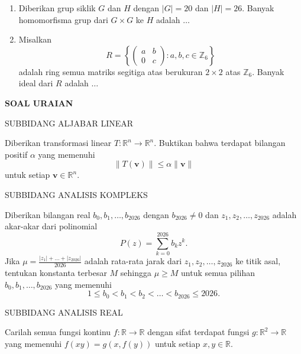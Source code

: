 \documentclass{article}
\begin{document}
\begin{enumerate}
  \item Diberikan grup siklik $G$ dan $H$ dengan $|G| = 20$ dan $|H| = 26$. Banyak homomorfisma grup dari $G \times G$ ke $H$ adalah $\dots$

  \item Misalkan
        \[
          R = \left\{ \begin{pmatrix} a & b \\ 0 & c \end{pmatrix} : a,b,c \in \mathbb{Z}_6 \right\}
        \]
        adalah ring semua matriks segitiga atas berukuran $2 \times 2$ atas $\mathbb{Z}_6$. Banyak ideal dari $R$ adalah $\dots$
\end{enumerate}

\newpage

\begin{center}
  \textbf{SOAL URAIAN}
\end{center}

\vspace{0.5cm}

\begin{center}
  SUBBIDANG ALJABAR LINEAR
\end{center}

Diberikan transformasi linear $T : \mathbb{R}^n \to \mathbb{R}^n$. Buktikan bahwa terdapat bilangan positif $\alpha$ yang memenuhi
\[
  \|T(\mathbf{v})\| \le \alpha \|\mathbf{v}\|
\]
untuk setiap $\mathbf{v} \in \mathbb{R}^n$.

\vspace{0.5cm}

\begin{center}
  SUBBIDANG ANALISIS KOMPLEKS
\end{center}

Diberikan bilangan real $b_0, b_1, \dots, b_{2026}$ dengan $b_{2026} \neq 0$ dan $z_1, z_2, \dots, z_{2026}$ adalah akar-akar dari polinomial
\[
  P(z) = \sum_{k=0}^{2026} b_k z^k.
\]
Jika $\displaystyle \mu = \frac{|z_1| + \dots + |z_{2026}|}{2026}$ adalah rata-rata jarak dari $z_1, z_2, \dots, z_{2026}$ ke titik asal, tentukan konstanta terbesar $M$ sehingga $\mu \ge M$ untuk semua pilihan $b_0, b_1, \dots, b_{2026}$ yang memenuhi
\[
  1 \le b_0 < b_1 < b_2 < \dots < b_{2026} \le 2026.
\]

\vspace{0.5cm}

\begin{center}
  SUBBIDANG ANALISIS REAL
\end{center}

Carilah semua fungsi kontinu $f : \mathbb{R} \to \mathbb{R}$ dengan sifat terdapat fungsi $g : \mathbb{R}^2 \to \mathbb{R}$ yang memenuhi $f(xy) = g(x, f(y))$ untuk setiap $x, y \in \mathbb{R}$.
\end{document}
